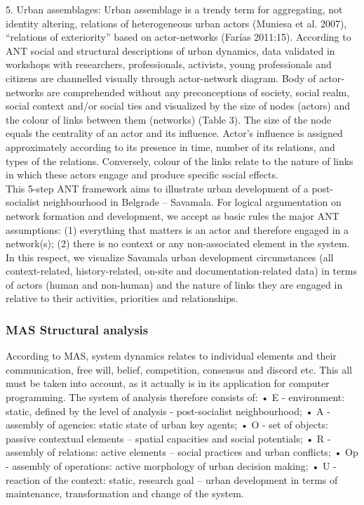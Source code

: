 \documentclass[11pt]{report}
\begin{document}
5.	Urban assemblages: Urban assemblage is a trendy term for aggregating, not identity altering, relations of heterogeneous urban actors (Muniesa et al. 2007), “relations of exteriority” based on actor-networks (Farías 2011:15).
According to ANT social and structural descriptions of urban dynamics, data validated in workshops with researchers, professionals, activists, young professionals and citizens are channelled visually through actor-network diagram. Body of actor-networks are comprehended without any preconceptions of society, social realm, social context and/or social ties and visualized by the size of nodes (actors) and the colour of links between them (networks) (Table 3). The size of the node equals the centrality of an actor and its influence. Actor’s influence is assigned approximately according to its presence in time, number of its relations, and types of the relations. Conversely, colour of the links relate to the nature of links in which these actors engage and produce specific social effects.
\\
This 5-step ANT framework aims to illustrate urban development of a post-socialist neighbourhood in Belgrade – Savamala. For logical argumentation on network formation and development, we accept as basic rules the major ANT assumptions: (1) everything that matters is an actor and therefore engaged in a network(s); (2) there is no context or any non-associated element in the system. In this respect, we visualize Savamala urban development circumstances (all context-related, history-related, on-site and documentation-related data) in terms of actors (human and non-human) and the nature of links they are engaged in relative to their activities, priorities and relationships.

\subsubsection{MAS Structural analysis}

According to MAS, system dynamics relates to individual elements and their communication, free will, belief, competition, consensus and discord etc. This all must be taken into account, as it actually is in its application for computer programming. The system of analysis therefore consists of:
•	E - environment: static, defined by the level of analysis - post-socialist neighbourhood;
•	A - assembly of agencies: static state of urban key agents;
•	O - set of objects: passive contextual elements – spatial capacities and social potentials;
•	R - assembly of relations: active elements – social practices and urban conflicts;
•	Op - assembly of operations: active morphology of urban decision making;
•	U - reaction of the context: static, research goal – urban development in terms of maintenance, transformation and change of the system.
\end{document}
